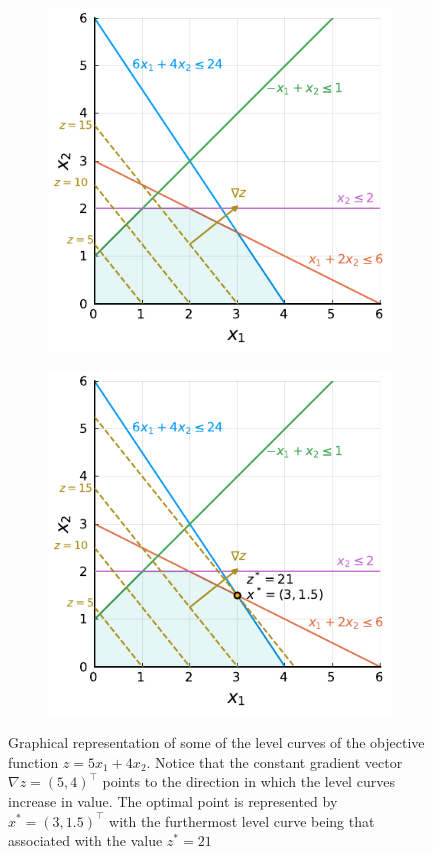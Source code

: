 \begin{figure}[h]
	\begin{subfigure}{0.45\textwidth}
		\includegraphics[scale=0.97]{part_1/chapter_1/figures/figure1-4a.pdf}  
		\caption{} \label{p1c1:fig:level_curves_a}	
	\end{subfigure}
	\begin{subfigure}{0.45\textwidth}
		\includegraphics[scale=0.97]{part_1/chapter_1/figures/figure1-4b.pdf}
		\caption{} \label{p1c1:fig:level_curves_b}	 
	\end{subfigure}
	\caption{Graphical representation of some of the level curves of the objective function $z = 5x_1 + 4x_2$. Notice that the constant gradient vector $\nabla z = (5,4)^\top$ points to the direction in which the level curves increase in value. The optimal point is represented by $x^*=(3, 1.5)^\top$ with the furthermost level curve being that associated with the value $z^* = 21$}	
\end{figure}

